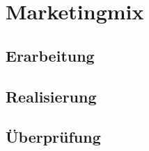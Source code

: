 \section{Marketingmix}
\label{sec:mix}

\subsection{Erarbeitung}

\subsection{Realisierung}

\subsection{Überprüfung}
